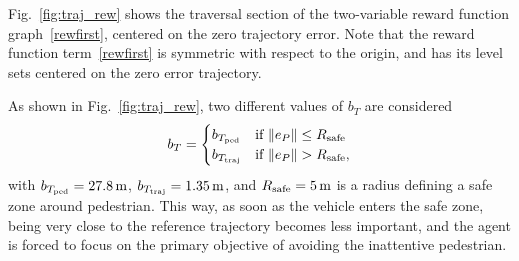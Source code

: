Fig.~\ref{fig:traj_rew} shows the traversal section of the two-variable reward function graph~\eqref{rewfirst}, centered on the zero trajectory error. Note that the reward function term~\eqref{rewfirst} is symmetric with respect to the origin, and has its level sets centered on the zero error trajectory.

As shown in Fig.~\ref{fig:traj_rew}, two different values of $b_T$ are considered
\begin{equation}
b_{T}= \begin{cases} b_{T_{\rm ped}} & \text{if } \|e_P\| \le R_{ \rm safe} \\  b_{T_{\rm traj}} & \text{if } \|e_P\| > R_{\rm safe},
\end{cases} 
\end{equation}
with $b_{T_{\rm ped}}=\SI{27.8}{\metre}$, $b_{T_{\rm traj}} =\SI{1.35}{\metre}$, and $R_{\rm safe} = \SI{5}{\metre}$ is a radius defining a safe zone around pedestrian. This way, as soon as the vehicle enters the safe zone, being very close to the reference trajectory becomes less important, and the agent is forced to focus on the primary objective of avoiding the inattentive pedestrian.
